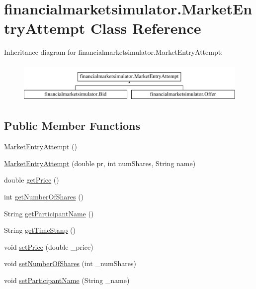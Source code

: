 \hypertarget{classfinancialmarketsimulator_1_1_market_entry_attempt}{\section{financialmarketsimulator.\+Market\+Entry\+Attempt Class Reference}
\label{classfinancialmarketsimulator_1_1_market_entry_attempt}
}
Inheritance diagram for financialmarketsimulator.\+Market\+Entry\+Attempt\+:\begin{figure}[H]
\begin{center}
\leavevmode
\includegraphics[height=2.000000cm]{classfinancialmarketsimulator_1_1_market_entry_attempt}
\end{center}
\end{figure}
\subsection*{Public Member Functions}
\begin{DoxyCompactItemize}
\item 
\hyperlink{classfinancialmarketsimulator_1_1_market_entry_attempt_a18b910056492a3eca05b112d7003bea7}{Market\+Entry\+Attempt} ()
\item 
\hyperlink{classfinancialmarketsimulator_1_1_market_entry_attempt_a9b2f8a9eef7975bc053907e2ea05c779}{Market\+Entry\+Attempt} (double pr, int num\+Shares, String name)
\item 
double \hyperlink{classfinancialmarketsimulator_1_1_market_entry_attempt_a465bd475d2cf836c09e51e26ae937e66}{get\+Price} ()
\item 
int \hyperlink{classfinancialmarketsimulator_1_1_market_entry_attempt_ae48c6d1bc9ef23b88d077ee194686946}{get\+Number\+Of\+Shares} ()
\item 
String \hyperlink{classfinancialmarketsimulator_1_1_market_entry_attempt_a7c461ce88325da7ce771ef3e8284616c}{get\+Participant\+Name} ()
\item 
String \hyperlink{classfinancialmarketsimulator_1_1_market_entry_attempt_a48ec5ce3d7d0451da742f3290f0e3b52}{get\+Time\+Stanp} ()
\item 
void \hyperlink{classfinancialmarketsimulator_1_1_market_entry_attempt_ac350f88eed14da376cb58aa920df2f38}{set\+Price} (double \+\_\+price)
\item 
void \hyperlink{classfinancialmarketsimulator_1_1_market_entry_attempt_a27476573fd4a0aa03270c648500a3c98}{set\+Number\+Of\+Shares} (int \+\_\+num\+Shares)
\item 
void \hyperlink{classfinancialmarketsimulator_1_1_market_entry_attempt_af2b5d63e0ac8d2e39cf474e128739c8a}{set\+Participant\+Name} (String \+\_\+name)
\end{DoxyCompactItemize}
